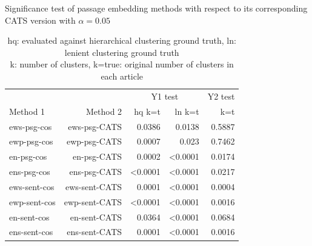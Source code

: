 

\begin{table}[t]
\centering
\caption{Significance test of passage embedding methods with respect to its corresponding CATS version with $\alpha = 0.05$}
\label{tab:sigt}
\begin{tabular}{@{}lrrrr@{}}\toprule
&& \multicolumn{2}{c}{Y1 test} & Y2 test  \\
\cmidrule(r){3-4}
\cmidrule(r){5-5}
Method 1 & Method 2 & hq k=t & ln k=t & k=t \\\midrule
ews-psg-cos & ews-psg-CATS & 0.0386 & 0.0138 & 0.5887 \\ 
ewp-psg-cos & ewp-psg-CATS & 0.0007 & 0.023 & 0.7462 \\ 
en-psg-cos & en-psg-CATS & 0.0002 & <0.0001 & 0.0174 \\ 
ens-psg-cos & ens-psg-CATS & <0.0001 & <0.0001 & 0.0217 \\
ews-sent-cos & ews-sent-CATS & 0.0001 & <0.0001 & 0.0004 \\
ewp-sent-cos & ewp-sent-CATS & <0.0001 & <0.0001 & 0.0016 \\
en-sent-cos & en-sent-CATS & 0.0364 & <0.0001 & 0.0684 \\
ens-sent-cos & ens-sent-CATS & 0.0001 & <0.0001 & 0.0016 \\
\bottomrule
\end{tabular}
\caption*{hq: evaluated against hierarchical clustering ground truth, ln: lenient clustering ground truth\\
k: number of clusters, k=true: original number of clusters in each article}
\end{table}

